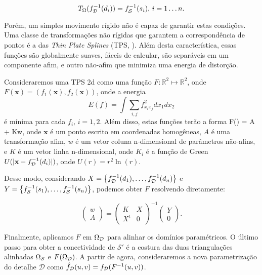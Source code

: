 \begin{equation}
T_\Omega (f_\deta^{-1}(d_i)) = f_\super^{-1}(s_i), \, i=1 \dots n.
\label{cond}
\end{equation}

Porém, um simples movimento rígido não é capaz de garantir estas condições. Uma classe de transformações não rígidas que garantem a correspondência de pontos é a das \emph{Thin Plate Splines} (TPS, \cite{Bookstein}). Além desta característica, essas funções são globalmente suaves, fáceis de calcular, são separáveis em um componente afim, e outro não-afim que minimiza uma energia de distorção.

Consideraremos uma TPS 2d como uma função $F \colon \mathbb{R}^2 \mapsto \mathbb{R}^2$, onde $F(\mathbf{x}) = (f_1(\mathbf{x}),f_2(\mathbf{x}))$, onde a energia
$$ E(f) = \int \sum_{i,j} f_{x_i x_j}^2 dx_1dx_2$$
é mínima para cada $f_i, \, i=1,2$. Além disso, estas funções terão a forma F() = A + Kw, onde $\mathbf{x}$ é um ponto escrito em coordenadas homogêneas, $A$ é uma transformação afim, $w$ é um vetor coluna n-dimensional de parâmetros não-afins, e $K$ é um vetor linha n-dimensional, onde $K_i$ é a função de Green $U(|\mathbf{x}-f_{\mathcal{D}}^{-1}(d_i)|)$, onde $U(r)=r^2 \ln (r)$.

Desse modo, considerando $X = \left\{f_{\mathcal{D}}^{-1}(d_1),\dots,f_{\mathcal{D}}^{-1}(d_n) \right\}$ e $Y = \left\{f_{\mathcal{S}}^{-1}(s_1),\dots,f_{\mathcal{S}}^{-1}(s_n) \right\}$, podemos obter $F$ resolvendo diretamente:

$$ \left( \begin{array}{c}
w \\
\hline
A \end{array} \right)
=
 \left( \begin{array}{c|c}
K & X \\
\hline
X^t & 0 \end{array} \right)^{-1}
 \left( \begin{array}{c}
Y \\
\hline
0 \end{array} \right).
$$

Finalmente, aplicamos $F$ em $\Omega_{\mathcal{D}}$ para alinhar os domínios paramétricos. O último passo para obter a conectividade de $\mathcal{S}'$ é a costura das duas triangulações alinhadas $\Omega_{\mathcal{S}}$ e $F(\Omega_{\mathcal{D}})$. A partir de agora, consideraremos a nova parametrização do detalhe $\mathcal{D}$ como $\hat{f}_{\mathcal{D}}(u,v) = f_{\mathcal{D}}(F^{-1}(u,v))$. 

